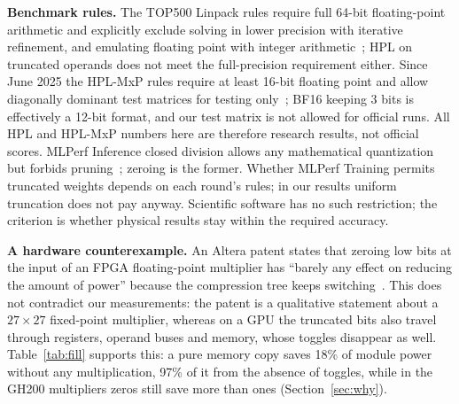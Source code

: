 \documentclass[conference]{IEEEtran}
\newcommand{\pct}{\%}
\begin{document}
\textbf{Benchmark rules.} The TOP500 Linpack rules require full 64-bit floating-point arithmetic and explicitly
exclude solving in lower precision with iterative refinement, and emulating floating point with integer
arithmetic~\cite{TOP500Linpack}; HPL on truncated operands does not meet the full-precision requirement either.
Since June 2025 the HPL-MxP rules require at least 16-bit floating point and allow diagonally dominant
test matrices for testing only~\cite{HPLMxPRules}; BF16 keeping 3 bits is effectively a 12-bit format, and our test matrix
is not allowed for official runs. All HPL and HPL-MxP numbers here are therefore research results, not official
scores. MLPerf Inference closed division allows any mathematical quantization but forbids
pruning~\cite{MLPerfInfRules}; zeroing is the former. Whether MLPerf Training permits truncated weights depends on
each round's rules; in our results uniform truncation does not pay anyway. Scientific software has no such
restriction; the criterion is whether physical results stay within the required accuracy.

\textbf{A hardware counterexample.} An Altera patent states that zeroing low bits at the input of an FPGA
floating-point multiplier has ``barely any effect on reducing the amount of power'' because the compression tree
keeps switching~\cite{Altera2017}. This does not contradict our measurements: the patent is a qualitative statement
about a $27{\times}27$ fixed-point multiplier, whereas on a GPU the truncated bits also travel through registers,
operand buses and memory, whose toggles disappear as well. Table~\ref{tab:fill} supports this: a pure memory copy
saves 18\pct{} of module power without any multiplication, 97\pct{} of it from the absence of toggles, while in the
GH200 multipliers zeros still save more than ones (Section~\ref{sec:why}).
\end{document}

